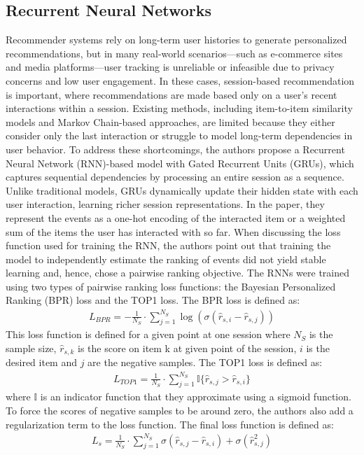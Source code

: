 \documentclass{ieeetj}
\begin{document}
\subsection{Recurrent Neural Networks\cite{hidasi2015session} }
Recommender systems rely on long-term user histories to generate personalized recommendations, but in many real-world scenarios—such as e-commerce sites and media platforms—user tracking is unreliable or infeasible due to privacy concerns and low user engagement. In these cases, session-based recommendation is important, where recommendations are made based only on a user's recent interactions within a session. Existing methods, including item-to-item similarity models and Markov Chain-based approaches, are limited because they either consider only the last interaction or struggle to model long-term dependencies in user behavior. To address these shortcomings, the authors propose a Recurrent Neural Network (RNN)-based model with Gated Recurrent Units (GRUs), which captures sequential dependencies by processing an entire session as a sequence. Unlike traditional models, GRUs dynamically update their hidden state with each user interaction, learning richer session representations. In the paper, they represent the events as a one-hot encoding of the interacted item or a weighted sum of the items the user has interacted with so far. When discussing the loss function used for training the RNN, the authors point out that training the model to independently estimate the ranking of events did not yield stable learning and, hence, chose a pairwise ranking objective. The RNNs were trained using two types of pairwise ranking loss functions: the Bayesian Personalized Ranking (BPR) loss and the TOP1 loss. The BPR loss is defined as:
\begin{equation}
\label{eq:bpr}
\begin{aligned}
	L_{BPR}=-\frac{1}{N_S} \cdot \sum_{j=1}^{N_S} \log\left( \sigma(\hat{r}_{s,i} - \hat{r}_{s,j}) \right)
\end{aligned}
\end{equation}
This loss function is defined for a given point at one session where $N_S$ is the sample size, $\hat{r}_{s,k}$ is the score on item k at given point of the session, $i$ is the desired item and $j$ are the negative samples. 
The TOP1 loss is defined as:
\begin{equation}
\label{eq:top1}
\begin{aligned}
	L_{TOP1} = \frac{1}{N_S} \cdot \sum_{j=1}^{N_S} \mathbb{I}\{\hat{r}_{s,j} > \hat{r}_{s,i}\}
\end{aligned}
\end{equation}
where $\mathbb{I}$ is an indicator function that they approximate using a sigmoid function. To force the scores of negative samples to be around zero, the authors also add a regularization term to the loss function. The final loss function is defined as:
\begin{equation}
\label{eq:final loss}
\begin{aligned}
	L_s = \frac{1}{N_S} \cdot \sum_{j=1}^{N_S} \sigma\left(\hat{r}_{s,j} - \hat{r}_{s,i}\right) + \sigma\left(\hat{r}_{s,j}^2\right)
\end{aligned}
\end{equation}
\end{document}
